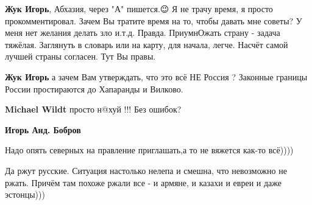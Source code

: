 \begin{itemize}
\begin{itemize}
 
\textbf{Жук Игорь}, Абхазия, через "А" пишется.😉 Я не трачу время, я просто прокомментировал. Зачем Вы тратите время на то, чтобы давать мне советы? У меня нет желания делать зло и.т.д. Правда. ПриумнОжать страну - задача тяжёлая. Заглянуть в словарь или на карту, для начала, легче. Насчёт самой лучшей страны согласен. Тут Вы правы.

 
\textbf{Жук Игорь} а зачем Вам утверждать, что это всё НЕ Россия ? Законные границы России простираются до Хапаранды и Вилково.

 
\textbf{Michael Wildt} просто н@хуй !!! Без ошибок?

 
\textbf{Игорь Анд. Бобров}

\end{itemize}

 
Надо опять северных на правление приглашать,а то не вяжется как-то всё))))

 

Да ржут русские. Ситуация настолько нелепа и смешна, что невозможно не ржать.
Причём там похоже ржали все - и армяне, и казахи и евреи и даже эстонцы)))



\end{itemize}
